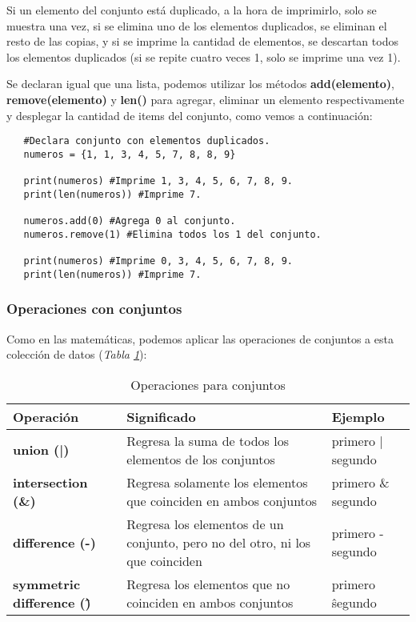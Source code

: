 Si un elemento del conjunto está duplicado, a la hora de imprimirlo, solo se muestra una vez, si se elimina uno de los elementos duplicados, se eliminan el resto de las copias, y si se imprime la cantidad de elementos, se descartan todos los elementos duplicados (si se repite cuatro veces 1, solo se imprime una vez 1).

Se declaran igual que una lista, podemos utilizar los métodos \textbf{add(elemento)},  \textbf{remove(elemento)} y \textbf{len()} para agregar, eliminar un elemento respectivamente y desplegar la cantidad de items del conjunto, como vemos a continuación:
\begin{lstlisting}
   #Declara conjunto con elementos duplicados.
   numeros = {1, 1, 3, 4, 5, 7, 8, 8, 9}
   
   print(numeros) #Imprime 1, 3, 4, 5, 6, 7, 8, 9.
   print(len(numeros)) #Imprime 7.
   
   numeros.add(0) #Agrega 0 al conjunto.
   numeros.remove(1) #Elimina todos los 1 del conjunto.
   
   print(numeros) #Imprime 0, 3, 4, 5, 6, 7, 8, 9.
   print(len(numeros)) #Imprime 7.
\end{lstlisting}


\subsubsection{Operaciones con conjuntos}
\hspace{0.55cm}Como en las matemáticas, podemos aplicar las operaciones de conjuntos a esta colección de datos (\textit{Tabla \ref{tab: 9}}):
\begin{table}[H]
    \begin{center}
        \caption{Operaciones para conjuntos}
        \label{tab: 9}
        \begin{tabular}{m{4cm} m{5cm} m{4cm}}
            \hline
            \textbf{Operación}&\textbf{Significado}&\textbf{Ejemplo} \\
            \hline
            \textbf{union (|)}					& Regresa la suma de todos los elementos de los conjuntos							& primero | segundo \\
            \textbf{intersection (\&)}			& Regresa solamente los elementos que coinciden en ambos conjuntos					& primero \& segundo \\
            \textbf{difference (-)}			& Regresa los elementos de un conjunto, pero no del otro, ni los que coinciden	& primero - segundo \\
            \textbf{symmetric difference (\^)}	& Regresa los elementos que no coinciden en ambos conjuntos						& primero \^ segundo \\
            \hline
        \end{tabular}
    \end{center}    
\end{table}


